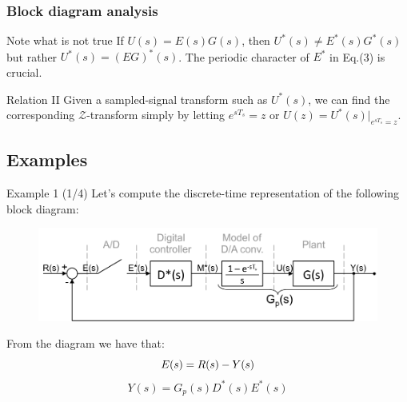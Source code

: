 \begin{frame}
	\frametitle{Block diagram analysis}
	\begin{alertblock}{Note what is not true}
		\justify
		If $U(s) = E(s)G(s)$, then $U^{*}(s) \neq E^{*}(s) G^{*}(s)$ but rather $U^{*}(s) = (EG)^{*}(s)$. The periodic character of $E^{*}$ in Eq.(3) is crucial.
	\end{alertblock}
	\vspace{1em}
	\begin{block}{Relation II}
		\justify
		Given a sampled-signal transform such as $U^{*}(s)$, we can find the corresponding $\mathcal{Z}$-transform simply by letting $e^{sT_s} = z$ or $U(z) = U^{*}(s)|_{e^{sT_s} = z}$.
	\end{block}
\end{frame}

\subsection{Examples}

\begin{frame}
	\begin{exampleblock}{Example 1 (1/4)}
		Let's compute the discrete-time representation of the following block diagram:
		\vspace{-1em}
		\begin{figure}
		\centering
		\includegraphics[width=1\linewidth]{block_analysis_2}
		\end{figure}
		From the diagram we have that:
		\vspace{-1em} 
		\begin{equation}
			E(s) = R(s) - Y(s)
			\vspace{-1em}
		\end{equation}
		\begin{equation}
			Y(s) = G_p(s)D^{*}(s)E^{*}(s)
		\end{equation}
	\end{exampleblock}
\end{frame}

